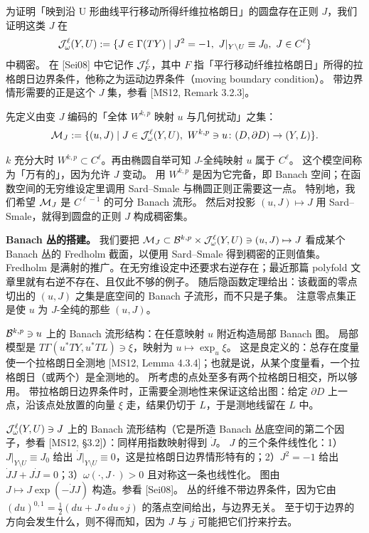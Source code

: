 

为证明「映到沿 U 形曲线平行移动所得纤维拉格朗日」的圆盘存在正则 $J$，我们证明这类 $J$ 在
\[
\mathcal{J}^\ell_\omega(Y,U):=\{J\in\Gamma(TY)\mid J^2=-1,\ J|_{Y\setminus U}\equiv J_0,\ J\in C^\ell\}
\]
中稠密。
在 [Sei08] 中它记作 $\mathcal{J}^\ell_F$，其中 $F$ 指「平行移动纤维拉格朗日」所得的拉格朗日边界条件，他称之为运动边界条件（moving boundary condition）。
带边界情形需要的正是这个 $J$ 集，参看 [MS12, Remark 3.2.3]。

先定义由变 $J$ 编码的「全体 $W^{k,p}$ 映射 $u$ 与几何扰动」之集：
\[
\mathcal{M}_J:=\{(u,J)\mid J\in\mathcal{J}^\ell_\omega(Y,U),\ W^{k,p}\ni u\colon(D,\partial D)\to(Y,L)\}.
\]

$k$ 充分大时 $W^{k,p}\subset C^\ell$。再由椭圆自举可知 $J$-全纯映射 $u$ 属于 $C^\ell$。
这个模空间称为「万有的」，因为允许 $J$ 变动。
用 $W^{k,p}$ 是因为它完备，即 Banach 空间；在函数空间的无穷维设定里调用 Sard--Smale 与椭圆正则正需要这一点。
特别地，我们希望 $\mathcal{M}_J$ 是 $C^{\ell-1}$ 的可分 Banach 流形。
然后对投影 $(u,J)\mapsto J$ 用 Sard--Smale，就得到圆盘的正则 $J$ 构成稠密集。

\textbf{Banach 丛的搭建。}
我们要把 $\mathcal{M}_J\subset\mathcal{B}^{k,p}\times\mathcal{J}^\ell_\omega(Y,U)\ni(u,J)\mapsto J$ 看成某个 Banach 丛的 Fredholm 截面，以便用 Sard--Smale 得到稠密的正则值集。
Fredholm 是满射的推广。在无穷维设定中还要求右逆存在；最近那篇 polyfold 文章里就有右逆不存在、且仅此不够的例子。
随后隐函数定理给出：该截面的零点切出的 $(u,J)$ 之集是底空间的 Banach 子流形，而不只是子集。
注意零点集正是使 $u$ 为 $J$-全纯的那些 $(u,J)$。

$\mathcal{B}^{k,p}\ni u$ 上的 Banach 流形结构：在任意映射 $u$ 附近构造局部 Banach 图。
局部模型是 $T\Gamma(u^*TY,u^*TL)\ni\xi$，映射为 $u\mapsto\exp_u\xi$。
这是良定义的：总存在度量使一个拉格朗日全测地 [MS12, Lemma 4.3.4]；也就是说，从某个度量看，一个拉格朗日（或两个）是全测地的。
所考虑的点处至多有两个拉格朗日相交，所以够用。
带拉格朗日边界条件时，正需要全测地性来保证这给出图：给定 $\partial D$ 上一点，沿该点处放置的向量 $\xi$ 走，结果仍切于 $L$，于是测地线留在 $L$ 中。

$\mathcal{J}^\ell_\omega(Y,U)\ni J$ 上的 Banach 流形结构（它是所造 Banach 丛底空间的第二个因子，参看 [MS12, §3.2]）：同样用指数映射得到 $\dot J$。
$J$ 的三个条件线性化：1）$J|_{Y\setminus U}\equiv J_0$ 给出 $\dot J|_{Y\setminus U}\equiv0$，这是拉格朗日边界情形特有的；2）$J^2=-1$ 给出 $\dot JJ+J\dot J=0$；3）$\omega(\cdot,J\cdot)>0$ 且对称这一条也线性化。
图由 $J\mapsto J\exp(-\dot JJ)$ 构造。参看 [Sei08]。
丛的纤维不带边界条件，因为它由 $(du)^{0,1}=\frac12(du+J\circ du\circ j)$ 的落点空间给出，与边界无关。
至于切于边界的方向会发生什么，则不得而知，因为 $J$ 与 $j$ 可能把它们拧来拧去。

